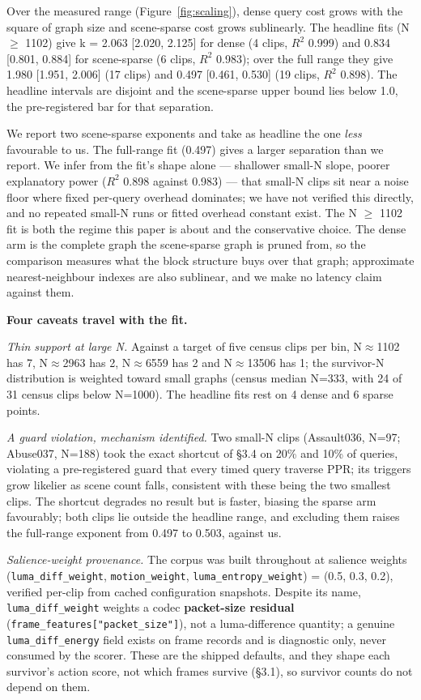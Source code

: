 \documentclass[sigconf,review,anonymous]{acmart}
\begin{document}
Over the measured range (Figure~\ref{fig:scaling}), dense query cost grows with the square of graph size and
scene-sparse cost grows sublinearly. The headline fits (N \ensuremath{\geq} 1102) give k = 2.063 {[}2.020, 2.125{]} for dense
(4 clips, $R^2$ 0.999) and 0.834 {[}0.801, 0.884{]} for scene-sparse (6 clips, $R^2$ 0.983); over the full
range they give 1.980 {[}1.951, 2.006{]} (17 clips) and 0.497 {[}0.461, 0.530{]} (19 clips, $R^2$ 0.898).
The headline intervals are disjoint and the
scene-sparse upper bound lies below 1.0, the pre-registered bar for that separation.

We report two scene-sparse exponents and take as headline the one \emph{less} favourable to us.
The full-range fit (0.497) gives a larger separation than we report. We infer from the fit's
shape alone --- shallower small-N slope, poorer explanatory power (\(R^2\) 0.898 against 0.983) ---
that small-N clips sit near a noise floor where fixed per-query overhead dominates; we have
not verified this directly, and no repeated small-N runs or fitted overhead constant exist.
The N \ensuremath{\geq} 1102 fit is both the regime this paper is about and the conservative choice.
The dense arm is the complete graph the scene-sparse graph is pruned from, so the comparison
measures what the block structure buys over that graph; approximate nearest-neighbour indexes
are also sublinear, and we make no latency claim against them.

\textbf{Four caveats travel with the fit.}

\emph{Thin support at large N.} Against a target of five census clips per bin, N\ensuremath{\approx}1102 has 7, N\ensuremath{\approx}2963 has
2, N\ensuremath{\approx}6559 has 2 and N\ensuremath{\approx}13506 has 1; the survivor-N distribution is weighted toward small
graphs (census median N=333, with 24 of 31 census clips below N=1000). The headline fits rest on 4 dense
and 6 sparse points.

\emph{A guard violation, mechanism identified.} Two small-N clips (Assault036, N=97; Abuse037,
N=188) took the exact shortcut of §3.4 on 20\% and 10\% of queries, violating a pre-registered
guard that every timed query traverse PPR; its triggers grow likelier as scene count falls,
consistent with these being the two smallest clips. The shortcut degrades no result but is
faster, biasing the sparse arm favourably; both clips lie outside the headline range, and
excluding them raises the full-range exponent from 0.497 to 0.503, against us.

\emph{Salience-weight provenance.} The corpus was built throughout at salience weights
(\texttt{luma\_diff\_weight}, \texttt{motion\_weight}, \texttt{luma\_entropy\_weight}) = (0.5, 0.3, 0.2), verified
per-clip from cached configuration snapshots. Despite its name, \texttt{luma\_diff\_weight} weights a
codec \textbf{packet-size residual} (\texttt{frame\_features{[}"packet\_size"{]}}), not a luma-difference
quantity; a genuine \texttt{luma\_diff\_energy} field exists on frame records and is diagnostic only,
never consumed by the scorer. These are the shipped defaults, and they shape each survivor's
action score, not which frames survive (§3.1), so survivor counts do not depend on them.
\end{document}
